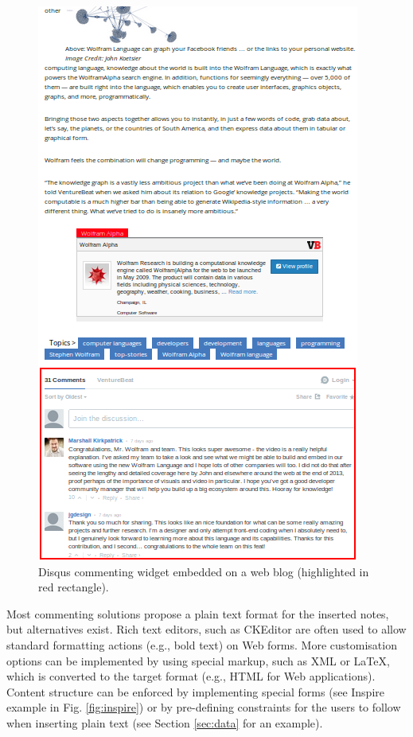 \begin{figure}[!h]
  \centering
  \includegraphics[scale=0.7]{static/img/disqus.png}
  \caption[Disqus commenting widget embedded on a web blog]
          {Disqus commenting widget embedded on a web blog (highlighted in red rectangle).}
  \label{fig:disqus}
\end{figure}

Most commenting solutions propose a plain text format for the inserted notes,
but alternatives exist. Rich text editors, such as CKEditor \cite{ref:cked} are
often used to allow standard formatting actions (e.g., bold text) on Web forms.
More customisation options can be implemented by using special markup, such as
XML or LaTeX, which is converted to the target format (e.g., HTML for Web
applications). Content structure can be enforced by implementing special forms
(see Inspire example in Fig. \ref{fig:inspire}) or by pre-defining constraints
for the users to follow when inserting plain text (see Section \ref{sec:data}
for an example).

